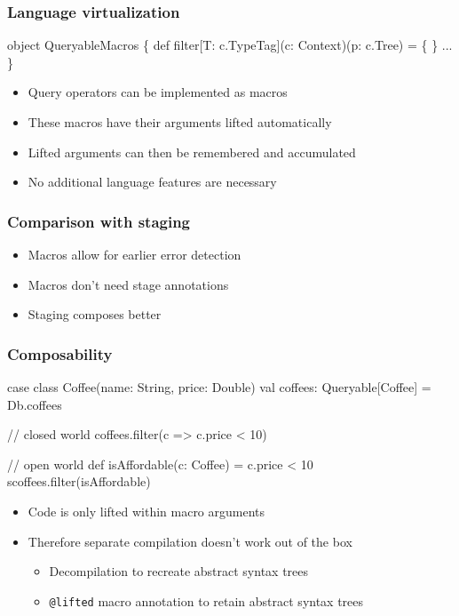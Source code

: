 \documentclass[svgnames,hyperref={bookmarks=false}]{beamer}
\begin{document}
\begin{frame}[fragile, t]
\frametitle{Language virtualization}

\begin{semiverbatim}
object QueryableMacros \{
  def filter[T: c.TypeTag](c: Context)(p: c.Tree) = \{
  \}
  ...
\}

\end{semiverbatim}

\begin{itemize}
\item Query operators can be implemented as macros
\item These macros have their arguments lifted automatically
\item Lifted arguments can then be remembered and accumulated
\item No additional language features are necessary
\end{itemize}
\end{frame}

\begin{frame}[fragile]
\frametitle{Comparison with staging}

\begin{itemize}
\item Macros allow for earlier error detection
\item Macros don't need stage annotations
\item Staging composes better
\end{itemize}
\end{frame}

\begin{frame}[fragile]
\frametitle{Composability}

\begin{semiverbatim}
case class Coffee(name: String, price: Double)
val coffees: Queryable[Coffee] = Db.coffees

// closed world
coffees.filter(c => c.price < 10)

// open world
def isAffordable(c: Coffee) = c.price < 10
scoffees.filter(isAffordable)

\end{semiverbatim}

\begin{itemize}
\item Code is only lifted within macro arguments
\item Therefore separate compilation doesn't work out of the box
\begin{itemize}
\item Decompilation to recreate abstract syntax trees
\item \texttt{@lifted} macro annotation to retain abstract syntax trees
\end{itemize}
\end{itemize}
\end{frame}
\end{document}
